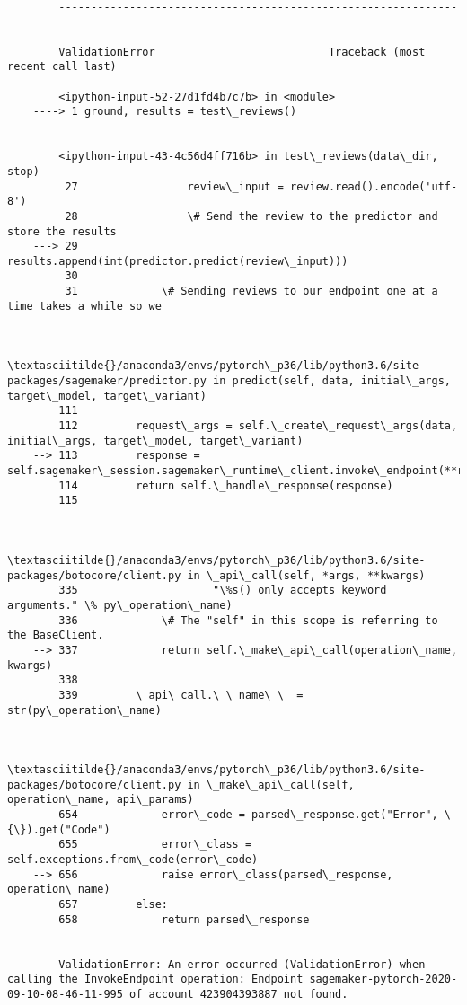 \documentclass[11pt]{article}
\begin{document}
    \begin{Verbatim}[commandchars=\\\{\}]

        ---------------------------------------------------------------------------

        ValidationError                           Traceback (most recent call last)

        <ipython-input-52-27d1fd4b7c7b> in <module>
    ----> 1 ground, results = test\_reviews()
    

        <ipython-input-43-4c56d4ff716b> in test\_reviews(data\_dir, stop)
         27                 review\_input = review.read().encode('utf-8')
         28                 \# Send the review to the predictor and store the results
    ---> 29                 results.append(int(predictor.predict(review\_input)))
         30 
         31             \# Sending reviews to our endpoint one at a time takes a while so we


        \textasciitilde{}/anaconda3/envs/pytorch\_p36/lib/python3.6/site-packages/sagemaker/predictor.py in predict(self, data, initial\_args, target\_model, target\_variant)
        111 
        112         request\_args = self.\_create\_request\_args(data, initial\_args, target\_model, target\_variant)
    --> 113         response = self.sagemaker\_session.sagemaker\_runtime\_client.invoke\_endpoint(**request\_args)
        114         return self.\_handle\_response(response)
        115 


        \textasciitilde{}/anaconda3/envs/pytorch\_p36/lib/python3.6/site-packages/botocore/client.py in \_api\_call(self, *args, **kwargs)
        335                     "\%s() only accepts keyword arguments." \% py\_operation\_name)
        336             \# The "self" in this scope is referring to the BaseClient.
    --> 337             return self.\_make\_api\_call(operation\_name, kwargs)
        338 
        339         \_api\_call.\_\_name\_\_ = str(py\_operation\_name)


        \textasciitilde{}/anaconda3/envs/pytorch\_p36/lib/python3.6/site-packages/botocore/client.py in \_make\_api\_call(self, operation\_name, api\_params)
        654             error\_code = parsed\_response.get("Error", \{\}).get("Code")
        655             error\_class = self.exceptions.from\_code(error\_code)
    --> 656             raise error\_class(parsed\_response, operation\_name)
        657         else:
        658             return parsed\_response


        ValidationError: An error occurred (ValidationError) when calling the InvokeEndpoint operation: Endpoint sagemaker-pytorch-2020-09-10-08-46-11-995 of account 423904393887 not found.

    \end{Verbatim}
\end{document}

